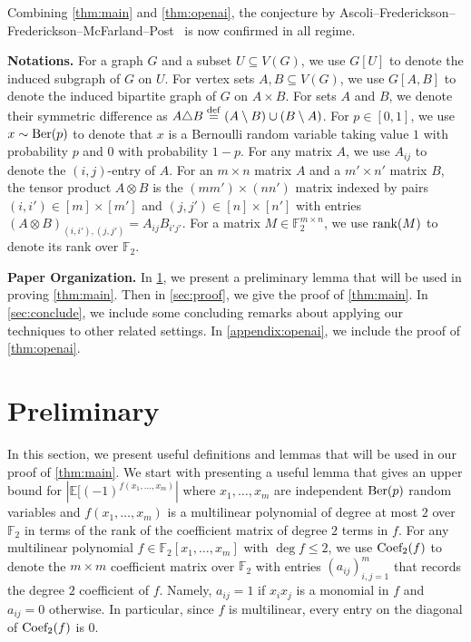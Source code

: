 \documentclass[reqno]{amsart}
\theoremstyle{definition}
\numberwithin{theorem}{section}
\renewcommand{\leq}{\le}
\newcommand{\E}{\mathbb{E}}
\newcommand{\FF}{\mathbb F}
\def\eqdef{\overset{\rm{def}}{=}}
\renewcommand{\le}{\leqslant}
\newcommand{\abs}[1]{\left|#1\right|}
\newcommand{\F}{\mathbb{F}}
\newcommand{\Ber}{\textup{Ber}}
\newcommand{\rank}{\textup{rank}}
\newcommand{\Coef}{\textup{Coef}}
\begin{document}
Combining \cref{thm:main} and \cref{thm:openai}, the conjecture by Ascoli--Frederickson--Frederickson--McFarland--Post~\cite{AFFMP26} is now confirmed in all regime.

\medskip \noindent\textbf{Notations.} For a graph $G$ and a subset $U\subseteq V(G)$, we use $G[U]$ to denote the induced subgraph of $G$ on $U$. For vertex sets $A,B\subseteq V(G)$, we use $G[A,B]$ to denote the induced bipartite graph of $G$ on $A\times B$. For sets $A$ and $B$, we denote their symmetric difference as $A\triangle B \eqdef (A\setminus B)\cup (B\setminus A)$. For $p\in [0,1]$, we use $x\sim \Ber(p)$ to denote that $x$ is a Bernoulli random variable taking value $1$ with probability $p$ and $0$ with probability $1-p$. For any matrix $A$, we use $A_{ij}$ to denote the $(i,j)$-entry of $A$. For an $m\times n$ matrix $A$ and a $m'\times n'$ matrix $B$, the tensor product $A\otimes B$ is the $(mm')\times(nn')$ matrix indexed by pairs $(i,i')\in [m]\times[m']$ and $(j,j')\in [n]\times[n']$ with entries $(A\otimes B)_{(i,i'),(j,j')} = A_{ij}B_{i'j'}$. For a matrix $M\in \F_2^{m\times n}$, we use $\rank(M)$ to denote its rank over $\F_2$.


\medskip \noindent \textbf{Paper Organization.} In \cref{sec:prelim}, we present a preliminary lemma that will be used in proving \cref{thm:main}. Then in \cref{sec:proof}, we give the proof of \cref{thm:main}. In \cref{sec:conclude}, we include some concluding remarks about applying our techniques to other related settings. In \cref{appendix:openai}, we include the proof of \cref{thm:openai}. 

\section{Preliminary}\label{sec:prelim}

In this section, we present useful definitions and lemmas that will be used in our proof of \cref{thm:main}. We start with presenting a useful lemma that gives an upper bound for $\abs{\E[(-1)^{f(x_1,\dots, x_m)}}$ where $x_1,\dots, x_m$ are independent $\Ber(p)$ random variables and $f(x_1,\dots,x_m)$ is a multilinear polynomial of degree at most $2$ over $\F_2$ in terms of the rank of the coefficient matrix of degree $2$ terms in $f$. For any multilinear polynomial $f\in\FF_2[x_1,\dots,x_m]$ with $\deg f\leq 2$, we use $\Coef_2(f)$ to denote the $m\times m$ coefficient matrix over $\F_2$ with entries $(a_{ij})_{i,j=1}^m$ that records the degree $2$ coefficient of $f$. Namely, $a_{ij}=1$ if $x_ix_j$ is a monomial in $f$ and $a_{ij}=0$ otherwise. In particular, since $f$ is multilinear, every entry on the diagonal of $\Coef_2(f)$ is $0$. 
\end{document}
